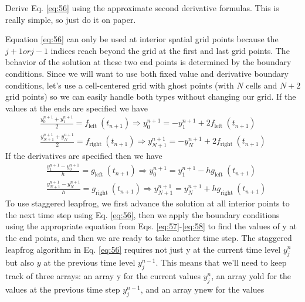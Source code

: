 \begin{problem}\label{P5.1} Derive Eq. \ref{eq:56} using the approximate second derivative formulas. This is
really simple, so just do it on paper.\end{problem}
Equation \ref{eq:56} can only be used at interior spatial grid points because the
$ j + 1 {or} j-1$  indices reach beyond the grid at the first and last grid points. The
behavior of the solution at these two end points is determined by the boundary
conditions. Since we will want to use both fixed value and derivative boundary
conditions, let\rq s use a cell-centered grid with ghost points (with $N$ cells and $N+2$ grid points) so we can easily handle both types without changing our grid. If the values at the ends are specified we have 
\begin{equation}\label{eq:57}
\begin{gathered}
\frac{y_{0}^{n+1}+y_{1}^{n+1}}{2}=f_{\text {left }}\left(t_{n+1}\right) \Rightarrow y_{0}^{n+1}=-y_{1}^{n+1}+2 f_{\text {left }}\left(t_{n+1}\right) \\
\frac{y_{N+1}^{n+1}+y_{N}^{n+1}}{2}=f_{\text {right }}\left(t_{n+1}\right) \Rightarrow y_{N+1}^{n+1}=-y_{N}^{n+1}+2 f_{\text {right }}\left(t_{n+1}\right)
\end{gathered}
\end{equation}
If the derivatives are specified then we have
\begin{equation}\label{eq:58}
\begin{aligned}
&\frac{y_{1}^{n+1}-y_{0}^{n+1}}{h}=g_{\text {left }}\left(t_{n+1}\right) \Rightarrow y_{0}^{n+1}=y_{1}^{n+1}-h g_{\text {left }}\left(t_{n+1}\right) \\
&\frac{y_{N+1}^{n+1}-y_{N}^{n+1}}{h}=g_{\text {right }}\left(t_{n+1}\right) \Rightarrow y_{N+1}^{n+1}=y_{N}^{n+1}+h g_{\text {right }}\left(t_{n+1}\right)
\end{aligned}
\end{equation}
To use staggered leapfrog, we first advance the solution at all interior points to
the next time step using Eq. \ref{eq:56}, then we apply the boundary conditions using
the appropriate equation from Eqs. \ref{eq:57}-\ref{eq:58} to find the values of y at the end
points, and then we are ready to take another time step.
The staggered leapfrog algorithm in Eq. \ref{eq:56} requires not just y at the current
time level $ y_j^n$ but also $y$ at the previous time level $y^{n−1}_j$. This means that we\rq ll need
to keep track of three arrays: an array y for the current values $ y_j^n$, an array yold
for the values at the previous time step $ y_j^{n-1}$, and an array ynew for the values
